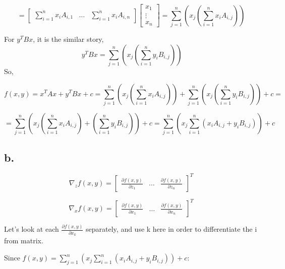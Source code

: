 \documentclass{article}
\begin{document}
\[  
=
\begin{bmatrix}
\sum_{i=1}^n x_i A_{i,1} & \dots & \sum_{i=1}^n x_i A_{i,n}
\end{bmatrix}
\begin{bmatrix}
x_1\\
\vdots\\
x_n
\end{bmatrix}
=
\sum_{j=1}^n (x_j (\sum_{i=1}^n x_i A_{i,j}))
\]

For $y^T Bx$, it is the similar story, \newline
\[ \
y^T Bx
=
\sum_{j=1}^n (x_j (\sum_{i=1}^n y_i B_{i,j})) \]
So, 

\[ f(x,y)= x^T Ax + y^T Bx + c
=
\sum_{j=1}^n (x_j (\sum_{i=1}^n x_i A_{i,j}))+\sum_{j=1}^n (x_j (\sum_{i=1}^n y_i B_{i,j}))+c
=
\]

\[
=
\sum_{j=1}^n (x_j (\sum_{i=1}^n x_i A_{i,j})+(\sum_{i=1}^n y_i B_{i,j}))+c
=
\sum_{j=1}^n (x_j \sum_{i=1}^n (x_i A_{i,j}+ y_i B_{i,j}))+c
\]

\subsection{b.}
\[
\nabla_z f(x,y)=
\begin{bmatrix}
\frac{\partial f(x,y)}{\partial z_1} &
\dots &
\frac{\partial f(x,y)}{\partial z_n}
\end{bmatrix}^T
\]

\[
\nabla_x f(x,y)=
\begin{bmatrix}
\frac{\partial f(x,y)}{\partial x_1} &
\dots &
\frac{\partial f(x,y)}{\partial x_n}
\end{bmatrix}^T
\]

Let's look at each $\frac{\partial f(x,y)}{\partial x_k}$ separately, and use k here in order to differentiate the i from matrix.\newline

Since $f(x,y)=\sum_{j=1}^n (x_j \sum_{i=1}^n (x_i A_{i,j}+ y_i B_{i,j}))+c$:
\end{document}

